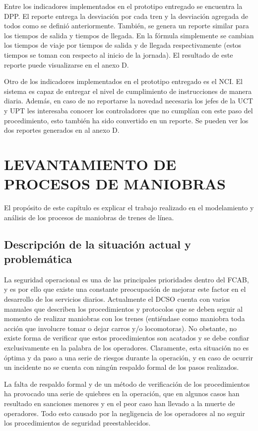 \documentclass[oneside,12pt, letterpaper, titlepage]{book}
\begin{document}
Entre los indicadores implementados en el prototipo entregado se encuentra la DPP. El reporte entrega la desviación por cada tren y la desviación agregada de todos como se definió anteriormente. También, se genera un reporte similar para los tiempos de salida y tiempos de llegada. En la fórmula simplemente se cambian los tiempos de viaje por tiempos de salida y de llegada respectivamente (estos tiempos se toman con respecto al inicio de la jornada). El resultado de este reporte puede visualizarse en el anexo D.

Otro de los indicadores implementados en el prototipo entregado es el NCI. El sistema es capaz de entregar el nivel de cumplimiento de instrucciones de manera diaria. Además, en caso de no reportarse la novedad necesaria los jefes de la UCT y UPT les interesaba conocer los controladores que no cumplían con este paso del procedimiento, esto también ha sido convertido en un reporte. Se pueden ver los dos reportes generados en al anexo D.

\chapter[Levantamiento de Procesos de Maniobras]{LEVANTAMIENTO DE PROCESOS DE MANIOBRAS}
El propósito de este capítulo es explicar el trabajo realizado en el modelamiento y análisis de los procesos de maniobras de trenes de línea.

\section{Descripción de la situación actual y problemática}
La seguridad operacional es una de las principales prioridades dentro del FCAB, y es por ello que existe una constante preocupación de mejorar este factor en el desarrollo de los servicios diarios. Actualmente el DCSO cuenta con varios manuales que describen los procedimientos y protocolos que se deben seguir al momento de realizar maniobras con los trenes (entiéndase como maniobra toda acción que involucre tomar o dejar carros y/o locomotoras). No obstante, no existe forma de verificar que estos procedimientos son acatados y se debe confiar exclusivamente en la palabra de los operadores. Claramente, esta situación no es óptima y da paso a una serie de riesgos durante la operación, y en caso de ocurrir un incidente no se cuenta con ningún respaldo formal de los pasos realizados.

La falta de respaldo formal y de un método de verificación de los procedimientos ha provocado una serie de quiebres en la operación, que en algunos casos han resultado en sanciones menores y en el peor caso han llevado a la muerte de operadores. Todo esto causado por la negligencia de los operadores al no seguir los procedimientos de seguridad preestablecidos. 
\end{document}
